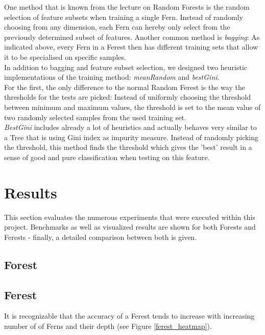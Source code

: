 \documentclass[twocolumn]{article}
\begin{document}
One method that is known from the lecture on Random Forests is the random selection of feature subsets when training a single Fern. Instead of randomly choosing from any dimension, each Fern can hereby only select from the previously determined subset of features. Another common method is \textit{bagging}: As indicated above, every Fern in a Ferest then has different training sets that allow it to be specialised on specific samples.\\
In addition to bagging and feature subset selection, we designed two heuristic implementations of the training method: \textit{meanRandom} and \textit{bestGini}.\\
For the first, the only difference to the normal Random Ferest is the way the thresholds for the tests are picked: Instead of uniformly choosing the threshold between minimum and maximum values, the threshold is set to the mean value of two randomly selected samples from the used training set.\\
\textit{BestGini} includes already a lot of heuristics and actually behaves very similar to a Tree that is using Gini index as impurity measure. Instead of randomly picking the threshold, this method finds the threshold which gives the 'best' result in a sense of good and pure classification when testing on this feature.


\section{Results}

This section evaluates the numerous experiments that were executed within this project. Benchmarks as well as visualized results are shown for both Forests and Ferests - finally, a detailed comparison between both is given.

\subsection{Forest}

\subsection{Ferest}

It is recognizable that the accuracy of a Ferest tends to increase with increasing number of of Ferns and their depth (see Figure \ref{ferest_heatmap}). 
\end{document}
